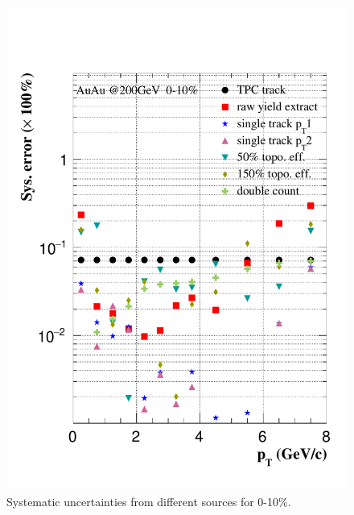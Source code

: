 \begin{figure}[htbp]
\begin{minipage}[htbp]{0.47\linewidth}
\centering
\includegraphics[width=1.0\textwidth,angle=0]{figure/Run14_D0HFT/sysErr_0_10.pdf}
\caption{ Systematic uncertainties from different sources for 0-10\%. \label{sysErr_0_10}}
\end{minipage}
\hfill
\begin{minipage}[htbp]{0.47\linewidth}
\centering

\end{minipage}
\end{figure}
